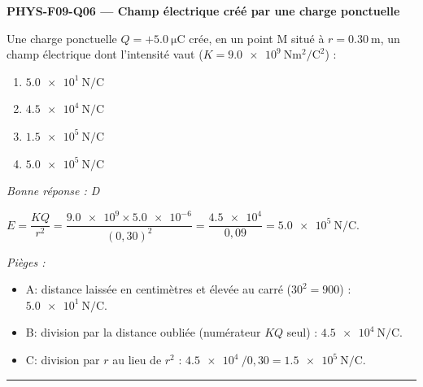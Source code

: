 \documentclass[11pt,a4paper]{article}
\begin{document}
\noindent\textbf{PHYS-F09-Q06 --- Champ électrique créé par une charge ponctuelle}\par
Une charge ponctuelle $Q=+\qty{5.0}{\micro\coulomb}$ crée, en un point M situé à $r=\qty{0.30}{\metre}$, un champ électrique dont l'intensité vaut ($K=\qty{9.0e9}{\newton\metre\squared\per\coulomb\squared}$) :
\begin{enumerate}[label=\Alph*)]
\item $\qty{5.0e1}{\newton\per\coulomb}$
\item $\qty{4.5e4}{\newton\per\coulomb}$
\item $\qty{1.5e5}{\newton\per\coulomb}$
\item $\qty{5.0e5}{\newton\per\coulomb}$
\end{enumerate}
\textit{Bonne réponse : D}\par
$E=\dfrac{KQ}{r^{2}}=\dfrac{\num{9.0e9}\times\num{5.0e-6}}{(0{,}30)^{2}}=\dfrac{\num{4.5e4}}{0{,}09}=\qty{5.0e5}{\newton\per\coulomb}$.\par
\textit{Pièges :}
\begin{itemize}
\item A: distance laissée en centimètres et élevée au carré ($30^{2}=900$) : $\qty{5.0e1}{\newton\per\coulomb}$.
\item B: division par la distance oubliée (numérateur $KQ$ seul) : $\qty{4.5e4}{\newton\per\coulomb}$.
\item C: division par $r$ au lieu de $r^{2}$ : $\qty{4.5e4}{}/0{,}30=\qty{1.5e5}{\newton\per\coulomb}$.
\end{itemize}
\vspace{8pt}\hrule\vspace{8pt}
\end{document}
